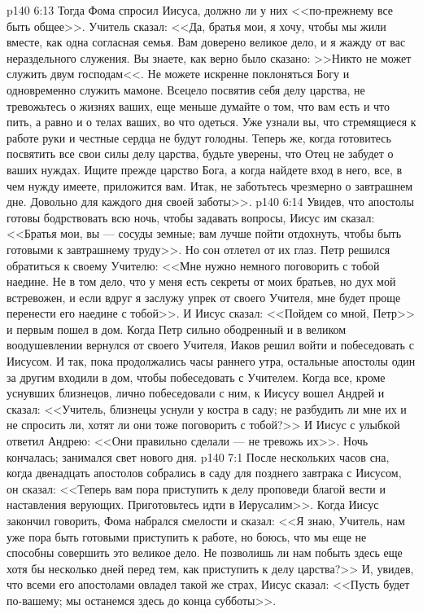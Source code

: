 \vs p140 6:13 Тогда Фома спросил Иисуса, должно ли у них <<по\hyp{}прежнему все быть общее>>. Учитель сказал: <<Да, братья мои, я хочу, чтобы мы жили вместе, как одна согласная семья. Вам доверено великое дело, и я жажду от вас нераздельного служения. Вы знаете, как верно было сказано: >>Никто не может служить двум господам<<. Не можете искренне поклоняться Богу и одновременно служить мамоне. Всецело посвятив себя делу царства, не тревожьтесь о жизнях ваших, еще меньше думайте о том, что вам есть и что пить, а равно и о телах ваших, во что одеться. Уже узнали вы, что стремящиеся к работе руки и честные сердца не будут голодны. Теперь же, когда готовитесь посвятить все свои силы делу царства, будьте уверены, что Отец не забудет о ваших нуждах. Ищите прежде царство Бога, а когда найдете вход в него, все, в чем нужду имеете, приложится вам. Итак, не заботьтесь чрезмерно о завтрашнем дне. Довольно для каждого дня своей заботы>>.
\vs p140 6:14 Увидев, что апостолы готовы бодрствовать всю ночь, чтобы задавать вопросы, Иисус им сказал: <<Братья мои, вы --- сосуды земные; вам лучше пойти отдохнуть, чтобы быть готовыми к завтрашнему труду>>. Но сон отлетел от их глаз. Петр решился обратиться к своему Учителю: <<Мне нужно немного поговорить с тобой наедине. Не в том дело, что у меня есть секреты от моих братьев, но дух мой встревожен, и если вдруг я заслужу упрек от своего Учителя, мне будет проще перенести его наедине с тобой>>. И Иисус сказал: <<Пойдем со мной, Петр>> и первым пошел в дом. Когда Петр сильно ободренный и в великом воодушевлении вернулся от своего Учителя, Иаков решил войти и побеседовать с Иисусом. И так, пока продолжались часы раннего утра, остальные апостолы один за другим входили в дом, чтобы побеседовать с Учителем. Когда все, кроме уснувших близнецов, лично побеседовали с ним, к Иисусу вошел Андрей и сказал: <<Учитель, близнецы уснули у костра в саду; не разбудить ли мне их и не спросить ли, хотят ли они тоже поговорить с тобой?>> И Иисус с улыбкой ответил Андрею: <<Они правильно сделали --- не тревожь их>>. Ночь кончалась; занимался свет нового дня.
\vs p140 7:1 После нескольких часов сна, когда двенадцать апостолов собрались в саду для позднего завтрака с Иисусом, он сказал: <<Теперь вам пора приступить к делу проповеди благой вести и наставления верующих. Приготовьтесь идти в Иерусалим>>. Когда Иисус закончил говорить, Фома набрался смелости и сказал: <<Я знаю, Учитель, нам уже пора быть готовыми приступить к работе, но боюсь, что мы еще не способны совершить это великое дело. Не позволишь ли нам побыть здесь еще хотя бы несколько дней перед тем, как приступить к делу царства?>> И, увидев, что всеми его апостолами овладел такой же страх, Иисус сказал: <<Пусть будет по\hyp{}вашему; мы останемся здесь до конца субботы>>.
